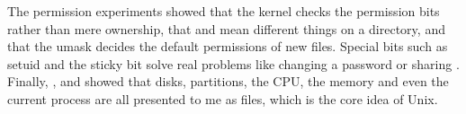 \documentclass[11pt,a4paper]{article}
\begin{document}
The permission experiments showed that the kernel checks the permission bits rather than mere
ownership, that  and  mean different things on a directory, and that the umask
decides the default permissions of new files. Special bits such as setuid and the sticky bit
solve real problems like changing a password or sharing . Finally, ,
 and  showed that disks, partitions, the CPU, the memory and even the
current process are all presented to me as files, which is the core idea of Unix.
\end{document}
